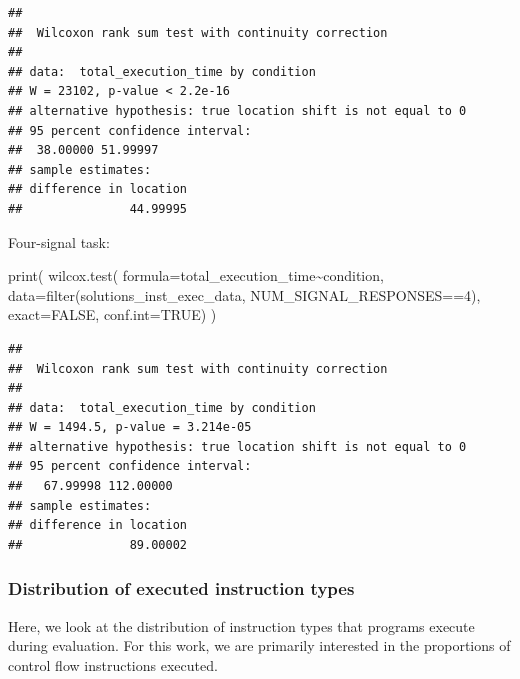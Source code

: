 \documentclass[
]{book}
\newenvironment{Shaded}{\begin{snugshade}}{\end{snugshade}}
\newcommand{\AttributeTok}[1]{\textcolor[rgb]{0.77,0.63,0.00}{#1}}
\newcommand{\ConstantTok}[1]{\textcolor[rgb]{0.00,0.00,0.00}{#1}}
\newcommand{\DecValTok}[1]{\textcolor[rgb]{0.00,0.00,0.81}{#1}}
\newcommand{\FunctionTok}[1]{\textcolor[rgb]{0.00,0.00,0.00}{#1}}
\newcommand{\NormalTok}[1]{#1}
\newcommand{\SpecialCharTok}[1]{\textcolor[rgb]{0.00,0.00,0.00}{#1}}
\begin{document}
\begin{verbatim}
## 
##  Wilcoxon rank sum test with continuity correction
## 
## data:  total_execution_time by condition
## W = 23102, p-value < 2.2e-16
## alternative hypothesis: true location shift is not equal to 0
## 95 percent confidence interval:
##  38.00000 51.99997
## sample estimates:
## difference in location 
##               44.99995
\end{verbatim}

Four-signal task:

\begin{Shaded}
\begin{Highlighting}[]
\FunctionTok{print}\NormalTok{(}
  \FunctionTok{wilcox.test}\NormalTok{(}
    \AttributeTok{formula=}\NormalTok{total\_execution\_time}\SpecialCharTok{\textasciitilde{}}\NormalTok{condition,}
    \AttributeTok{data=}\FunctionTok{filter}\NormalTok{(solutions\_inst\_exec\_data, NUM\_SIGNAL\_RESPONSES}\SpecialCharTok{==}\DecValTok{4}\NormalTok{),}
    \AttributeTok{exact=}\ConstantTok{FALSE}\NormalTok{,}
    \AttributeTok{conf.int=}\ConstantTok{TRUE}\NormalTok{)}
\NormalTok{)}
\end{Highlighting}
\end{Shaded}

\begin{verbatim}
## 
##  Wilcoxon rank sum test with continuity correction
## 
## data:  total_execution_time by condition
## W = 1494.5, p-value = 3.214e-05
## alternative hypothesis: true location shift is not equal to 0
## 95 percent confidence interval:
##   67.99998 112.00000
## sample estimates:
## difference in location 
##               89.00002
\end{verbatim}

\hypertarget{distribution-of-executed-instruction-types}{%
\subsubsection{Distribution of executed instruction types}\label{distribution-of-executed-instruction-types}}

Here, we look at the distribution of instruction types that programs execute during evaluation.
For this work, we are primarily interested in the proportions of control flow instructions executed.
\end{document}
